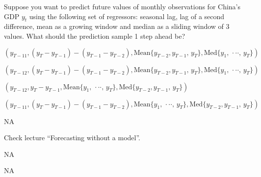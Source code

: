 
\begin{question}
Suppose you want to predict future values of monthly observations for China's GDP \(y_t\) using the following set of regressors: seasonal lag, lag of a second difference, mean as a growing window and median as a sliding window of 3 values. What should the prediction sample 1 step ahead be?
\begin{answerlist}
  \item \(\left(y_{T-11}, (y_T-y_{T-1}) - (y_{T-1}-y_{T-2}), \mathrm{Mean}\{y_{T-2}, y_{T-1},\,y_{T}\}, \mathrm{Med}\{y_{1},\,\cdot\cdot\cdot,\,y_{T}\}\right)\)
  \item \(\left(y_{T-12}, (y_T-y_{T-1}) - (y_{T-1}-y_{T-2}), \mathrm{Mean}\{y_{T-2}, y_{T-1},\,y_{T}\}, \mathrm{Med}\{y_{1},\,\cdot\cdot\cdot,\,y_{T}\}\right)\)
  \item \(\left(y_{T-12}, y_T-y_{T-1}, \mathrm{Mean}\{y_{1},\,\cdot\cdot\cdot,\,y_{T}\}, \mathrm{Med}\{y_{T-2}, y_{T-1},\,y_{T}\}\right)\)
  \item \(\left(y_{T-11}, (y_T-y_{T-1}) - (y_{T-1}-y_{T-2}), \mathrm{Mean}\{y_{1},\,\cdot\cdot\cdot,\,y_{T}\}, \mathrm{Med}\{y_{T-2}, y_{T-1},\,y_{T}\}\right)\)
\end{answerlist}
\end{question}

\begin{solution}
\begin{answerlist}
  \item NA
  \item Check lecture ``Forecasting without a model''.
  \item NA
  \item NA
\end{answerlist}
\end{solution}

